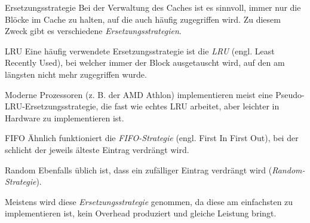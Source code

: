 \begin{defi}{Ersetzungsstrategie}
    Bei der Verwaltung des Caches ist es sinnvoll, immer nur die Blöcke im Cache zu halten, auf die auch häufig zugegriffen wird.
    Zu diesem Zweck gibt es verschiedene \emph{Ersetzungsstrategien}.
\end{defi}

\begin{defi}[Ersetzungsstrategie]{LRU}
    Eine häufig verwendete Ersetzungsstrategie ist die \emph{LRU} (engl. Least Recently Used), 
    bei welcher immer der Block ausgetauscht wird, auf den am längsten nicht mehr zugegriffen wurde.
    
    Moderne Prozessoren (z. B. der AMD Athlon) implementieren meist eine Pseudo-LRU-Ersetzungsstrategie, die fast wie echtes LRU arbeitet, aber leichter in Hardware zu implementieren ist.
\end{defi}

\begin{defi}[Ersetzungsstrategie]{FIFO}
    Ähnlich funktioniert die \emph{FIFO-Strategie} (engl. First In First Out), 
    bei der schlicht der jeweils älteste Eintrag verdrängt wird.
\end{defi}

\begin{defi}[Ersetzungsstrategie]{Random}
    Ebenfalls üblich ist, dass ein zufälliger Eintrag verdrängt wird (\emph{Random-Strategie}).
    
    Meistens wird diese \emph{Ersetzungsstrategie} genommen, 
    da diese am einfachsten zu implementieren ist, 
    kein Overhead produziert und gleiche Leistung bringt.
\end{defi}

